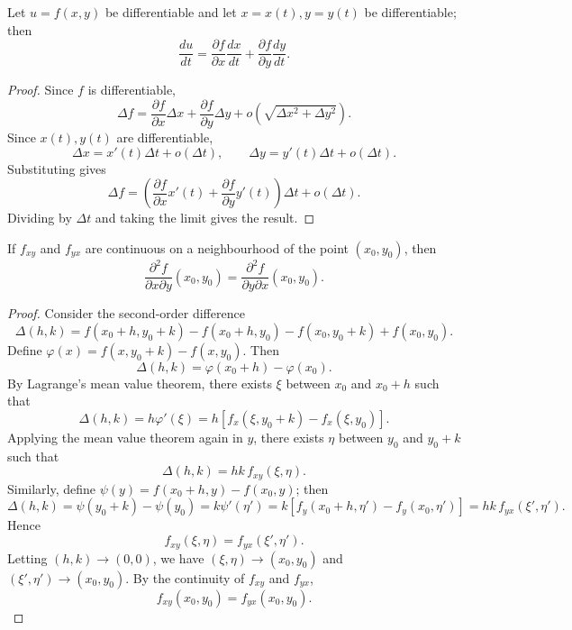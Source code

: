 \begin{theorem}\label{thm:multivariable_chain_rule}
Let $u = f(x, y)$ be differentiable and let $x = x(t), y = y(t)$ be differentiable; then
\[\frac{du}{dt} = \frac{\partial f}{\partial x}\frac{dx}{dt} + \frac{\partial f}{\partial y}\frac{dy}{dt}.\]
\end{theorem}

\begin{proof}
Since $f$ is differentiable,
\[
\Delta f = \frac{\partial f}{\partial x}\Delta x + \frac{\partial f}{\partial y}\Delta y + o\!\left(\sqrt{\Delta x^2 + \Delta y^2}\right).
\]
Since $x(t), y(t)$ are differentiable,
\[
\Delta x = x'(t)\Delta t + o(\Delta t), \qquad \Delta y = y'(t)\Delta t + o(\Delta t).
\]
Substituting gives
\[
\Delta f = \left( \frac{\partial f}{\partial x}x'(t) + \frac{\partial f}{\partial y}y'(t) \right)\Delta t + o(\Delta t).
\]
Dividing by $\Delta t$ and taking the limit gives the result.
\end{proof}

\begin{theorem}\label{thm:clairaut}
If $f_{xy}$ and $f_{yx}$ are continuous on a neighbourhood of the point $(x_0, y_0)$, then
\[\frac{\partial^2 f}{\partial x \partial y}(x_0, y_0) = \frac{\partial^2 f}{\partial y \partial x}(x_0, y_0).\]
\end{theorem}

\begin{proof}
Consider the second-order difference
\[
\Delta(h,k) = f(x_0+h, y_0+k) - f(x_0+h, y_0) - f(x_0, y_0+k) + f(x_0, y_0).
\]
Define $\varphi(x) = f(x, y_0+k) - f(x, y_0)$. Then
\[
\Delta(h,k) = \varphi(x_0+h) - \varphi(x_0).
\]
By Lagrange's mean value theorem, there exists $\xi$ between $x_0$ and $x_0+h$ such that
\[
\Delta(h,k) = h\varphi'(\xi) = h[f_x(\xi, y_0+k) - f_x(\xi, y_0)].
\]
Applying the mean value theorem again in $y$, there exists $\eta$ between $y_0$ and $y_0+k$ such that
\[
\Delta(h,k) = hk\, f_{xy}(\xi, \eta).
\]
Similarly, define $\psi(y) = f(x_0+h, y) - f(x_0, y)$; then
\[
\Delta(h,k) = \psi(y_0+k) - \psi(y_0) = k\psi'(\eta') = k[f_y(x_0+h, \eta') - f_y(x_0, \eta')] = hk\, f_{yx}(\xi', \eta').
\]
Hence
\[
f_{xy}(\xi, \eta) = f_{yx}(\xi', \eta').
\]
Letting $(h,k) \to (0,0)$, we have $(\xi,\eta) \to (x_0,y_0)$ and $(\xi',\eta') \to (x_0,y_0)$. By the continuity of $f_{xy}$ and $f_{yx}$,
\[
f_{xy}(x_0,y_0) = f_{yx}(x_0,y_0).
\]
\end{proof}

